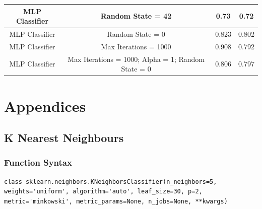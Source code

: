 \documentclass[12pt]{article}
\begin{document}
{\begin{landscape}
\begin{table}[]
\begin{tabular}{|c|c|c|c|}
MLP Classifier         & Random State = 42                                  & 0.73               & 0.72              \\ \hline
MLP Classifier         & Random State = 0                                   & 0.823              & 0.802             \\ \hline
MLP Classifier         & Max Iterations = 1000                              & 0.908              & 0.792             \\ \hline
MLP Classifier         & Max Iterations = 1000; Alpha = 1; Random State = 0 & 0.806              & 0.797             \\ \hline
\end{tabular}
\end{table}
\label{table:2}
\end{landscape}
\clearpage
}

\newpage
\section{Appendices}
\subsection{K Nearest Neighbours}
\subsubsection{Function Syntax}
\begin{lstlisting}
class sklearn.neighbors.KNeighborsClassifier(n_neighbors=5, weights='uniform', algorithm='auto', leaf_size=30, p=2, metric='minkowski', metric_params=None, n_jobs=None, **kwargs)
\end{lstlisting}
\end{document}
